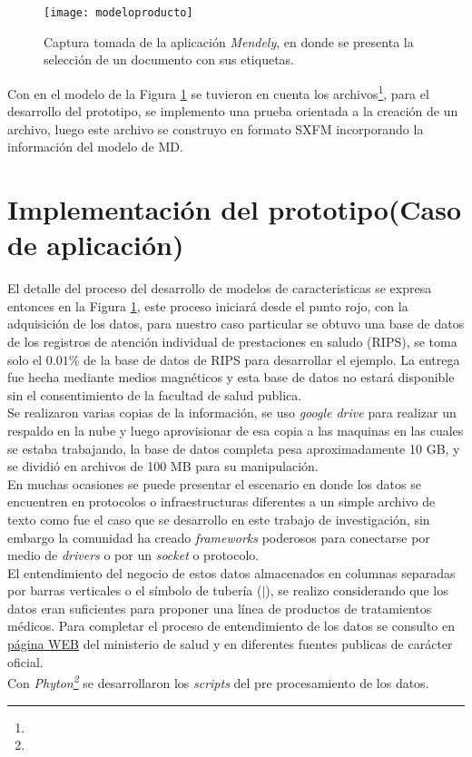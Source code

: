     \begin{figure}[h]
  	\centering
  	\texttt{[image: modeloproducto]}
  	\caption{Captura tomada de la aplicación \textit{Mendely}, en donde se presenta la selección de un documento con sus etiquetas.}
  	\label{modeloproducto}
  \end{figure}

Con en el modelo de la Figura \ref{modeloproducto} se tuvieron en cuenta los archivos\footnote{ }, para el desarrollo del prototipo, se implemento una prueba orientada a la creación de un archivo, luego este archivo se construyo en formato SXFM incorporando la información del modelo de MD.

  \section{Implementación del prototipo(Caso de aplicación)}
  El detalle del proceso del desarrollo de modelos de caracteristicas se expresa entonces en la Figura \ref{modeloproducto}, este proceso iniciará desde el punto rojo, con la adquisición de los datos, para nuestro caso particular se obtuvo una base de datos de los registros de atención individual de prestaciones en saludo (RIPS),  se toma solo el $0.01\%$ de la base de datos de RIPS para desarrollar el ejemplo. La entrega fue hecha mediante medios magnéticos y esta base de datos no estará disponible sin el consentimiento de la facultad de salud publica.\\
  Se realizaron varias copias de la información, se uso \textit{google drive} para realizar un respaldo en la nube y luego aprovisionar de esa copia a las maquinas en las cuales se estaba trabajando, la base de datos completa pesa aproximadamente 10 GB, y se dividió en archivos de 100 MB para su manipulación.\\
  En muchas ocasiones se puede presentar el escenario en donde los datos se encuentren en protocolos o infraestructuras diferentes a un simple archivo de texto como fue el caso que se desarrollo en este trabajo de investigación, sin embargo la comunidad ha creado \textit{frameworks} poderosos para conectarse por medio de \textit{drivers} o por un \textit{socket} o protocolo.\\
  El entendimiento del negocio de estos datos almacenados en columnas separadas por barras verticales o el símbolo de tubería ($\mid$), se realizo considerando que los datos eran suficientes para proponer una línea de productos de tratamientos médicos. Para completar el proceso de entendimiento de los datos se consulto en \href{https://www.minsalud.gov.co/proteccionsocial/Paginas/rips.aspx}{página WEB} del ministerio de salud y en diferentes fuentes publicas de carácter oficial.\\
  Con \textit{Phyton\footnote{  }} se desarrollaron los \textit{scripts} del pre procesamiento de los datos.
  
